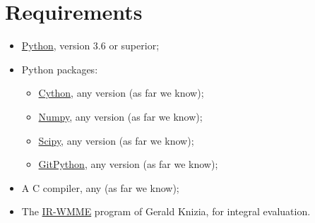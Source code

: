 \hypertarget{chap:requirements}{}
\chapter{Requirements}
\label{sec:requirements}
\chapterauthor{}

\begin{itemize}

\item \href{https://www.python.org/}{Python}, version 3.6 or superior;

\item Python packages:
  \begin{itemize}
  \item \href{https://cython.org/}{Cython}, any version (as far we know);
  \item \href{https://numpy.org/}{Numpy}, any version (as far we know);
  \item \href{https://www.scipy.org/}{Scipy}, any version (as far we know);
  \item \href{https://gitpython.readthedocs.io/en/stable/}{GitPython}, any version (as far we know);
  \end{itemize}

\item A C compiler, any (as far we know);

\item The \href{https://sites.psu.edu/knizia/software/}{IR-WMME} program of Gerald Knizia, for integral evaluation.

\end{itemize}





